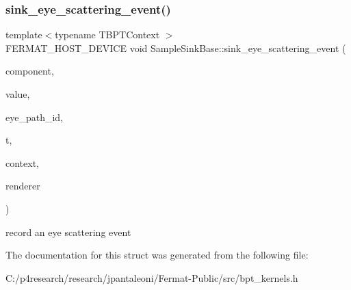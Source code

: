 \subsubsection{\texorpdfstring{sink\+\_\+eye\+\_\+scattering\+\_\+event()}{sink\_eye\_scattering\_event()}}
{\footnotesize\ttfamily template$<$typename T\+B\+P\+T\+Context $>$ \\
F\+E\+R\+M\+A\+T\+\_\+\+H\+O\+S\+T\+\_\+\+D\+E\+V\+I\+CE void Sample\+Sink\+Base\+::sink\+\_\+eye\+\_\+scattering\+\_\+event (\begin{DoxyParamCaption}\item[{const \hyperlink{struct_bsdf_a5f7db6f81220ed9ee6da109d6eb5b585}{Bsdf\+::\+Component\+Type}}]{component,  }\item[{const \hyperlink{structcugar_1_1_vector}{cugar\+::\+Vector4f}}]{value,  }\item[{const uint32}]{eye\+\_\+path\+\_\+id,  }\item[{const uint32}]{t,  }\item[{T\+B\+P\+T\+Context \&}]{context,  }\item[{\hyperlink{struct_rendering_context_view}{Rendering\+Context\+View} \&}]{renderer }\end{DoxyParamCaption})\hspace{0.3cm}{\ttfamily [inline]}}

record an eye scattering event 

The documentation for this struct was generated from the following file\+:\begin{DoxyCompactItemize}
\item 
C\+:/p4research/research/jpantaleoni/\+Fermat-\/\+Public/src/bpt\+\_\+kernels.\+h\end{DoxyCompactItemize}
